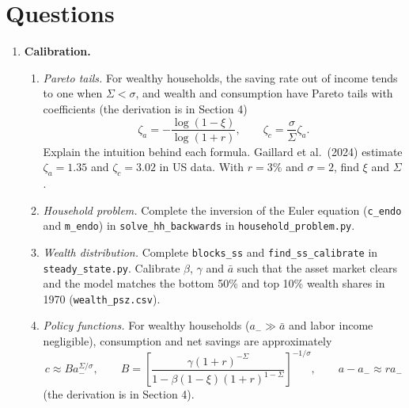 \section*{Questions}

\begin{enumerate}
\item \textbf{Calibration.}
\begin{enumerate}
\item \emph{Pareto tails.} For wealthy households, the saving rate out of income tends to one when $\Sigma<\sigma$, and wealth and consumption have Pareto tails with coefficients (the derivation is in Section 4)
$$\zeta_a=-\frac{\log(1-\xi)}{\log(1+r)},\qquad \zeta_c=\frac{\sigma}{\Sigma}\zeta_a.$$
Explain the intuition behind each formula. Gaillard et al.\ (2024) estimate $\zeta_a=1.35$ and $\zeta_c=3.02$ in US data. With $r=3\%$ and $\sigma=2$, find $\xi$ and $\Sigma$.
\item \emph{Household problem.} Complete the inversion of the Euler equation (\texttt{c\_endo} and \texttt{m\_endo}) in \texttt{solve\_hh\_backwards} in \texttt{household\_problem.py}.
\item \emph{Wealth distribution.} Complete \texttt{blocks\_ss} and \texttt{find\_ss\_calibrate} in \texttt{steady\_state.py}. Calibrate $\beta$, $\gamma$ and $\bar a$ such that the asset market clears and the model matches the bottom 50\% and top 10\% wealth shares in 1970 (\texttt{wealth\_psz.csv}).
\item \emph{Policy functions.} For wealthy households ($a_{-}\gg\bar a$ and labor income negligible), consumption and net savings are approximately
$$c\approx Ba_{-}^{\Sigma/\sigma},\qquad B=\left[\frac{\gamma(1+r)^{-\Sigma}}{1-\beta(1-\xi)(1+r)^{1-\Sigma}}\right]^{-1/\sigma},\qquad a-a_{-}\approx ra_{-}$$
(the derivation is in Section 4).

\end{enumerate}
\end{enumerate}
